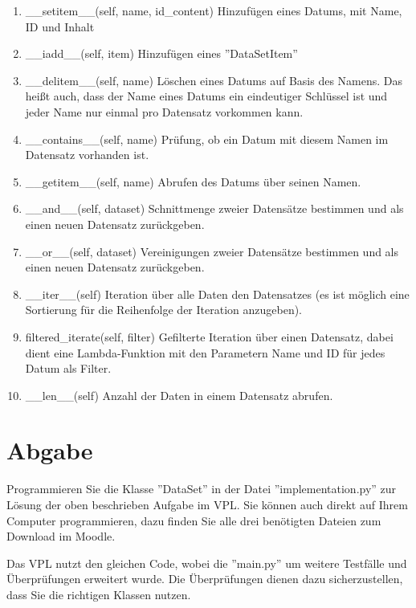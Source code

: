 \documentclass[
    oneside, %
    12pt, %
    a4paper, %
    parskip=full %
]{scrartcl}
\begin{document}
\begin{enumerate}
    \item \_\_setitem\_\_(self, name, id\_content)
        Hinzufügen eines Datums, mit Name, ID und Inhalt
    \item \_\_iadd\_\_(self, item) Hinzufügen eines ''DataSetItem''
    \item \_\_delitem\_\_(self, name) Löschen eines Datums auf Basis des Namens.
        Das heißt auch, dass der Name eines Datums ein eindeutiger Schlüssel ist und jeder Name nur einmal pro Datensatz vorkommen kann.
    \item \_\_contains\_\_(self, name) Prüfung, ob ein Datum mit diesem Namen im Datensatz vorhanden ist.
    \item \_\_getitem\_\_(self, name) Abrufen des Datums über seinen Namen.
    \item \_\_and\_\_(self, dataset) Schnittmenge zweier Datensätze bestimmen und als einen neuen Datensatz zurückgeben.
    \item \_\_or\_\_(self, dataset) Vereinigungen zweier Datensätze bestimmen und als einen neuen Datensatz zurückgeben.
    \item \_\_iter\_\_(self) Iteration über alle Daten den Datensatzes (es ist möglich eine Sortierung für die Reihenfolge der Iteration anzugeben).
    \item filtered\_iterate(self, filter) Gefilterte Iteration über einen Datensatz, dabei dient eine Lambda-Funktion mit den Parametern Name und ID für jedes Datum als Filter.
    \item \_\_len\_\_(self) Anzahl der Daten in einem Datensatz abrufen.
\end{enumerate}



\section{Abgabe}

Programmieren Sie die Klasse ''DataSet'' in der Datei ''implementation.py'' zur Lösung der oben beschrieben Aufgabe im VPL.
Sie können auch direkt auf Ihrem Computer programmieren, dazu finden Sie alle drei benötigten Dateien zum Download im Moodle.

Das VPL nutzt den gleichen Code, wobei die ''main.py'' um weitere Testfälle und Überprüfungen erweitert wurde.
Die Überprüfungen dienen dazu sicherzustellen, dass Sie die richtigen Klassen nutzen.\\
%
\end{document}
